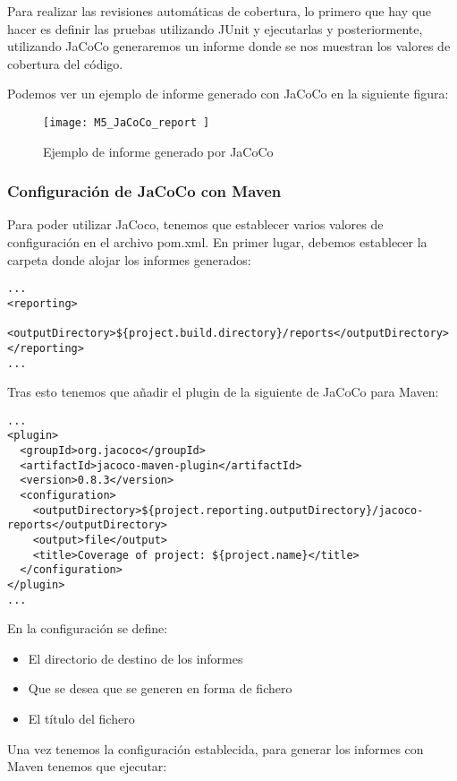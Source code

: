 Para realizar las revisiones automáticas de cobertura, lo primero que hay que hacer es definir las pruebas utilizando JUnit y ejecutarlas y posteriormente, utilizando JaCoCo generaremos un informe donde se nos muestran los valores de cobertura del código.

Podemos ver un ejemplo de informe generado con JaCoCo en la siguiente figura:

\begin{figure}[!h]
	\centering
	\texttt{[image: M5\_JaCoCo\_report ]}
	\caption{Ejemplo de informe generado por JaCoCo}\label{fig:M5_JaCoCo_report}
\end{figure}
\FloatBarrier


\subsubsection{Configuración de JaCoCo con Maven}

Para poder utilizar JaCoco, tenemos que establecer varios valores de configuración en el archivo pom.xml. En primer lugar, debemos establecer la carpeta donde alojar los informes generados:\\
\begin{minipage}{\linewidth}
{\tiny
\begin{verbatim}
...
<reporting>
  <outputDirectory>${project.build.directory}/reports</outputDirectory>
</reporting>
...
\end{verbatim}
}
\end{minipage}

Tras esto tenemos que añadir el plugin de la siguiente de JaCoCo para Maven:\\
\begin{minipage}{\linewidth}
{\tiny
\begin{verbatim}
...
<plugin>
  <groupId>org.jacoco</groupId>
  <artifactId>jacoco-maven-plugin</artifactId>
  <version>0.8.3</version>
  <configuration>
	<outputDirectory>${project.reporting.outputDirectory}/jacoco-reports</outputDirectory>
	<output>file</output>
	<title>Coverage of project: ${project.name}</title>
  </configuration>
</plugin>
...
\end{verbatim}
}
\end{minipage}
En la configuración se define:
\begin{itemize}
	\tightlist
	\item El directorio de destino de los informes
	\item Que se desea que se generen en forma de fichero
	\item El título del fichero
\end{itemize}
 Una vez tenemos la configuración establecida, para generar los informes con Maven tenemos que ejecutar:
 
